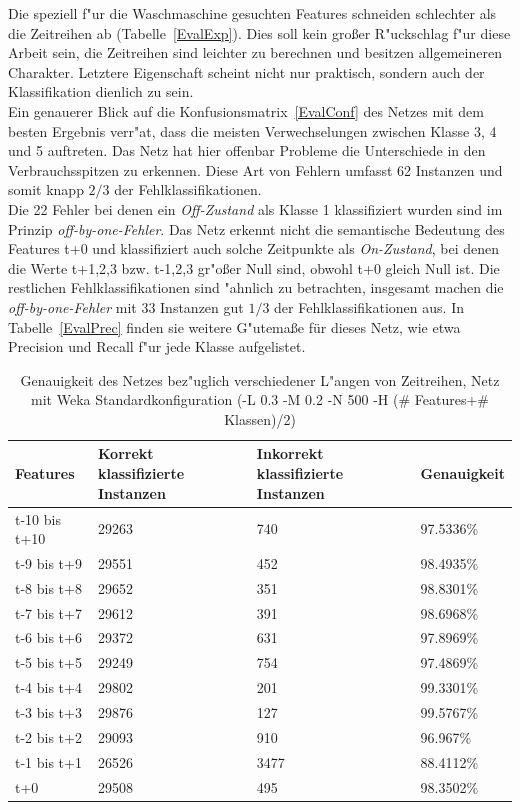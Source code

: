 Die speziell f"ur die Waschmaschine gesuchten Features schneiden schlechter als die Zeitreihen ab (Tabelle~\ref{EvalExp}). Dies soll kein gro{\ss}er R"uckschlag f"ur diese Arbeit sein, die Zeitreihen sind leichter zu berechnen und besitzen allgemeineren Charakter. Letztere Eigenschaft scheint nicht nur praktisch, sondern auch der Klassifikation dienlich zu sein.\\

Ein genauerer Blick auf die Konfusionsmatrix~\ref{EvalConf} des Netzes mit dem besten Ergebnis verr"at, dass die meisten Verwechselungen zwischen Klasse 3, 4 und 5 auftreten. Das Netz hat hier offenbar Probleme die Unterschiede in den Verbrauchsspitzen zu erkennen. Diese Art von Fehlern umfasst 62 Instanzen und somit knapp $2/3$ der Fehlklassifikationen. \\
Die 22 Fehler bei denen ein \textit{Off-Zustand} als Klasse 1 klassifiziert wurden sind im Prinzip \textit{off-by-one-Fehler}. Das Netz erkennt nicht die semantische Bedeutung des Features t+0 und klassifiziert auch solche Zeitpunkte als \textit{On-Zustand}, bei denen die Werte t+1,2,3 bzw. t-1,2,3 gr"o{\ss}er Null sind, obwohl t+0 gleich Null ist. Die restlichen Fehlklassifikationen sind "ahnlich zu betrachten, insgesamt machen die \textit{off-by-one-Fehler} mit 33 Instanzen gut $1/3$ der Fehlklassifikationen aus. In Tabelle~\ref{EvalPrec} finden sie weitere G"utema{\ss}e für dieses Netz, wie etwa Precision und Recall f"ur jede Klasse aufgelistet.\\

\begin{table}[h]
\begin{tabular}{l|p{4cm}|p{4cm}|l}
Features & Korrekt klassifizierte Instanzen & Inkorrekt klassifizierte Instanzen & Genauigkeit  \\
\hline
t-10 bis t+10 & 29263 & 740 & 97.5336\% \\
t-9 bis t+9 & 29551 & 452 & 98.4935\% \\
t-8 bis t+8 & 29652 & 351 & 98.8301\% \\
t-7 bis t+7 & 29612 & 391 & 98.6968\% \\
t-6 bis t+6 & 29372 & 631 & 97.8969\% \\
t-5 bis t+5 & 29249 & 754 & 97.4869\% \\
t-4 bis t+4 & 29802 & 201 & 99.3301\% \\
t-3 bis t+3 & 29876 & 127 & 99.5767\% \\
t-2 bis t+2 & 29093 & 910 & 96.967\% \\
t-1 bis t+1 & 26526 & 3477 & 88.4112\% \\
t+0 & 29508 & 495 & 98.3502\% 
\end{tabular}
\caption[Genauigkeit der Zeitreihen Features]{Genauigkeit des Netzes bez"uglich verschiedener L"angen von Zeitreihen, Netz mit Weka Standardkonfiguration (-L 0.3 -M 0.2 -N 500 -H (\# Features+\# Klassen)/2)}
\label{EvalZeit}
\end{table}


